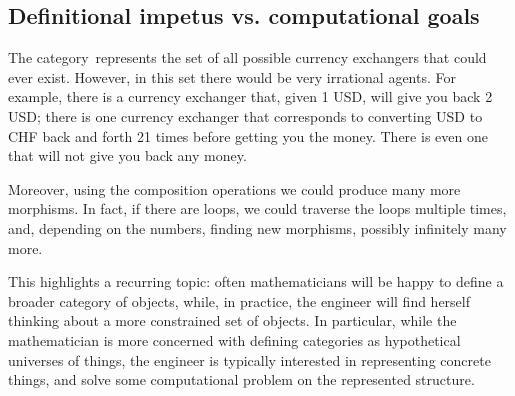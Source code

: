 


\subsection{Definitional impetus   vs. computational goals  }

The category~\Curr represents the set of all possible currency exchangers that could
ever exist. However, in this set there would be very irrational agents. For example, there is a currency exchanger that, given 1 USD, will give you back 2 USD; there is one currency exchanger that 
corresponds to converting USD to CHF back and forth 21 times before getting you the money. There is even one that will not give you back any money. 

Moreover, using the composition operations we could produce many more morphisms. In fact, if there are loops, we could traverse the loops multiple times, and, depending on the numbers, finding new morphisms, possibly infinitely many more.

This highlights a recurring topic: often mathematicians will be happy to define a broader category of objects, while, in practice, the engineer will find herself thinking about a more constrained set of objects. 
In particular, while the mathematician is more concerned with defining categories as hypothetical universes of things, the engineer is typically interested in representing concrete things, and solve some computational problem on the represented structure. 

